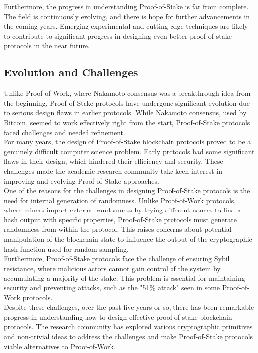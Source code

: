 Furthermore, the progress in understanding Proof-of-Stake is far from complete. The field is continuously evolving, and there is hope for further advancements in the coming years. Emerging experimental and cutting-edge techniques are likely to contribute to significant progress in designing even better proof-of-stake protocols in the near future.

\subsection*{Evolution and Challenges}
Unlike Proof-of-Work, where Nakamoto consensus was a breakthrough idea from the beginning, Proof-of-Stake protocols have undergone significant evolution due to serious design flaws in earlier protocols. While Nakamoto consensus, used by Bitcoin, seemed to work effectively right from the start, Proof-of-Stake protocols faced challenges and needed refinement.\\
For many years, the design of Proof-of-Stake blockchain protocols proved to be a genuinely difficult computer science problem. Early protocols had some significant flaws in their design, which hindered their efficiency and security. These challenges made the academic research community take keen interest in improving and evolving Proof-of-Stake approaches.\\
One of the reasons for the challenges in designing Proof-of-Stake protocols is the need for internal generation of randomness. Unlike Proof-of-Work protocols, where miners import external randomness by trying different nonces to find a hash output with specific properties, Proof-of-Stake protocols must generate randomness from within the protocol. This raises concerns about potential manipulation of the blockchain state to influence the output of the cryptographic hash function used for random sampling.\\
Furthermore, Proof-of-Stake protocols face the challenge of ensuring Sybil resistance, where malicious actors cannot gain control of the system by accumulating a majority of the stake. This problem is essential for maintaining security and preventing attacks, such as the "51\% attack" seen in some Proof-of-Work protocols.\\
Despite these challenges, over the past five years or so, there has been remarkable progress in understanding how to design effective proof-of-stake blockchain protocols. The research community has explored various cryptographic primitives and non-trivial ideas to address the challenges and make Proof-of-Stake protocols viable alternatives to Proof-of-Work.

